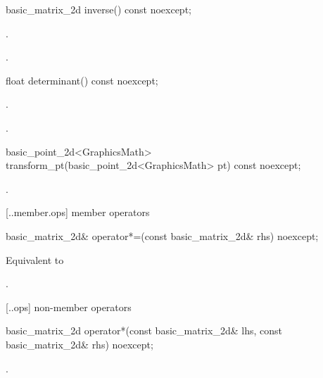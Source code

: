 %
\begin{itemdecl}
basic_matrix_2d inverse() const noexcept;
\end{itemdecl}
\begin{itemdescr}
\pnum
\requires
{}.

\pnum
\returns
{}.
\end{itemdescr}

%
\begin{itemdecl}
float determinant() const noexcept;
\end{itemdecl}
\begin{itemdescr}
\pnum
\requires
{}.

\pnum
\returns
{}.
\end{itemdescr}

%
\begin{itemdecl}
basic_point_2d<GraphicsMath> transform_pt(basic_point_2d<GraphicsMath> pt) const noexcept;
\end{itemdecl}
\begin{itemdescr}
\pnum
\returns
{}.
\end{itemdescr}

 [\iotwod.\matrixtwod.member.ops] { member operators}

%
\begin{itemdecl}
basic_matrix_2d& operator*=(const basic_matrix_2d& rhs) noexcept;
\end{itemdecl}
\begin{itemdescr}
\pnum
\effects
Equivalent to 

\pnum
\returns
{}.
\end{itemdescr}

 [\iotwod.\matrixtwod.ops] { non-member operators}

%
\begin{itemdecl}
basic_matrix_2d operator*(const basic_matrix_2d& lhs, const basic_matrix_2d& rhs)
  noexcept;
\end{itemdecl}
\begin{itemdescr}
\pnum
\returns
{}.
\end{itemdescr}

